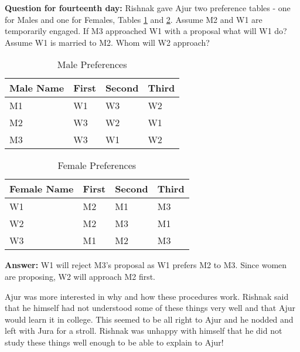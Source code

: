 \textbf{Question for fourteenth day:} Rishnak gave Ajur two preference tables - one for Males and one for Females, Tables \ref{16tq1} and \ref{16tq2}. Assume M2 and W1 are temporarily engaged. If M3 approached W1 with a proposal what will W1 do? Assume W1 is married to M2. Whom will W2 approach? 

\begin{table}
\begin{center}
\begin{tabular}{ |p{3cm}||p{1.5cm}||p{1.5cm} || p{1.5cm}|| }
 \hline
 \hline
 Male Name & First&Second&Third\\
 \hline
 M1  & W1   &W3&W2\\
 M2&W3&W2&W1\\
M3&W3&W1&W2\\
 
 
 \hline
\end{tabular}
\caption{Male Preferences}\label{16tq1}
\end{center}
\end{table}
\begin{table}
\begin{center}
\begin{tabular}{ |p{3cm}||p{1.5cm}||p{1.5cm} || p{1.5cm}|| }
 \hline
 \hline
 Female Name & First&Second&Third\\
 \hline
 W1 & M2    &M1&M3\\
W2&M2&M3&M1\\
W3&M1&M2&M3\\
 
 
 \hline
\end{tabular}
\caption{Female Preferences}\label{16tq2}
\end{center}
\end{table}


\textbf{Answer:} W1 will reject M3's proposal as W1 prefers M2 to M3. Since women are proposing, W2 will approach M2 first.


Ajur was more interested in why and how these procedures work. Rishnak said that he himself had not understood some of these things very well and that Ajur would learn it in college. This seemed to be all right to Ajur and he nodded and left with Jura for a stroll. Rishnak was unhappy with himself that he did not study these things well enough to be able to explain to Ajur! 

